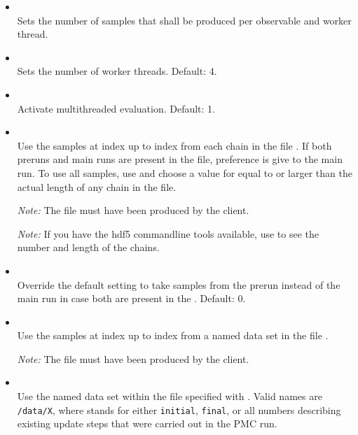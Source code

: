 \begin{itemize}
    \item[] \\[\medskipamount]
        Sets the number of samples that shall be produced per observable and
        worker thread.

    \item[] \\[\medskipamount]
        Sets the number of worker threads. Default: 4.

    \item[] \\[\medskipamount]
        Activate multithreaded evaluation. Default: 1.

    \item[] \\[\medskipamount]
        Use the samples at index  up to index  from
        each chain in the file . If both preruns and main runs are
        present in the file, preference is give to the main run. To use all
        samples, use  and choose a value for  equal to or
        larger than the actual length of any chain in the file.

        \emph{Note:} The file must have been produced by the
         client.

        \emph{Note:} If you have the hdf5 commandline tools available, use
         to see the number and length of the chains.

    \item[] \\[\medskipamount]
      Override the default setting to take samples from the prerun instead of
      the main run in case both are present in the . Default: 0.

    \item[] \\[\medskipamount]
        Use the samples at index  up to index  from
        a named data set in the file .

        \emph{Note:} The file must have been produced by the
         client.

    \item[] \\[\medskipamount]
        Use the named data set within the file specified with .
        Valid names are \texttt{/data/X}, where  stands for either
        \texttt{initial}, \texttt{final}, or all numbers describing existing
        update steps that were carried out in the PMC run.


\end{itemize}
